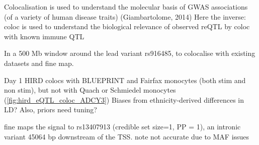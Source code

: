 \begin{outline}


\1 Colocalisation is used to understand the molecular basis of GWAS associations (of a variety of human disease traits) (Giambartolome, 2014)
\1 Here the inverse: coloc is used to understand the biological relevance of observed reQTL by coloc with known immune QTL

\1 In a 500 Mb window around the lead  variant rs916485,  to colocalise with existing datasets and fine map.

\1 Day 1 HIRD colocs with BLUEPRINT and Fairfax monocytes (both stim and non stim), but not with Quach or Schmiedel monocytes (\autoref{fig:hird_eQTL_coloc_ADCY3})
\2 Biases from ethnicity-derived differences in LD?
\2 Also, priors need tuning?

\1  fine maps the signal to rs13407913 (credible set size=1, PP = 1), an intronic variant 45064 bp downstream of the TSS.
    \2 note not accurate due to MAF issues



\end{outline}

